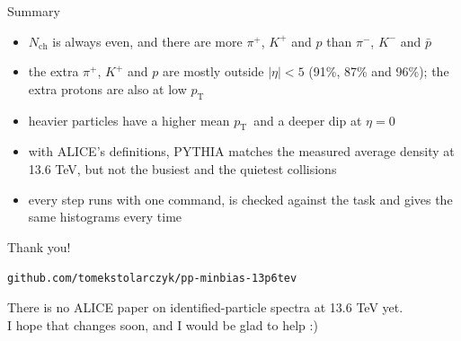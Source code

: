 \documentclass[aspectratio=169,11pt]{beamer}
\newcommand{\pt}{\ensuremath{p_\mathrm{T}}}
\newcommand{\pbar}{\ensuremath{\bar{p}}}
\begin{document}
\begin{frame}{Summary}
  \begin{itemize}
    \item $N_\mathrm{ch}$ is always even, and there are more $\pi^+$, $K^+$ and $p$ than $\pi^-$, $K^-$ and \pbar
    \item the extra $\pi^+$, $K^+$ and $p$ are mostly outside $|\eta| < 5$ (91\%, 87\% and 96\%);
          the extra protons are also at low \pt
    \item heavier particles have a higher mean \pt\ and a deeper dip at $\eta = 0$
    \item with ALICE's definitions, PYTHIA matches the measured average density at 13.6 TeV,
          but not the busiest and the quietest collisions
    \item every step runs with one command, is checked against the task and gives the same histograms every time
  \end{itemize}
\end{frame}

\begin{frame}[standout]
  Thank you!

  \vspace{1em}
  \normalsize
  \texttt{github.com/tomekstolarczyk/pp-minbias-13p6tev}

  \vspace{0.5em}
  \footnotesize
  There is no ALICE paper on identified-particle spectra at 13.6 TeV yet.\\
  I hope that changes soon, and I would be glad to help :)
\end{frame}
\end{document}
